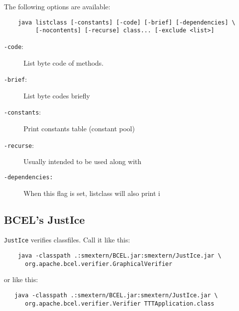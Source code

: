 The following options are available:
\begin{verbatim}
    java listclass [-constants] [-code] [-brief] [-dependencies] \
         [-nocontents] [-recurse] class... [-exclude <list>]
\end{verbatim}

\begin{description}
   \item[{\tt -code}:] 
       List byte code of methods.
   \item[{\tt -brief}:] 
       List byte codes briefly
   \item[{\tt -constants}:] 
       Print constants table (constant pool)
   \item[{\tt -recurse}:]  
       Usually intended to be used along with
   \item[{\tt -dependencies:}]
       When this flag is set, listclass will also print i
\end{description}

\subsection{BCEL's JustIce}
{\tt JustIce} verifies classfiles. Call it like this:
\begin{verbatim}
    java -classpath .:smextern/BCEL.jar:smextern/JustIce.jar \
      org.apache.bcel.verifier.GraphicalVerifier
\end{verbatim}
or like this:
\begin{verbatim}
   java -classpath .:smextern/BCEL.jar:smextern/JustIce.jar \
      org.apache.bcel.verifier.Verifier TTTApplication.class
\end{verbatim}
